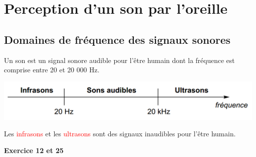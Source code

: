 \section{Perception d'un son par l'oreille}
\subsection{Domaines de fréquence des signaux sonores}
\begin{tcolorbox}[colback=red!5!white,colframe=red!75!black,title=\textbf{Fréquences des signaux sonores : }]
Un son est un signal sonore audible pour l'être humain dont la fréquence est comprise entre 20 et 20 000 Hz.
\begin{center}
    \includegraphics[scale=0.7]{Images/Cours/Chapitre_3/domaine_freq.PNG}
\end{center}
Les \textcolor{red}{infrasons} et les \textcolor{red}{ultrasons} sont des signaux inaudibles pour l'être humain.
\end{tcolorbox}
\begin{Large}
\end{Large}\textbf{Exercice 12 et 25}



